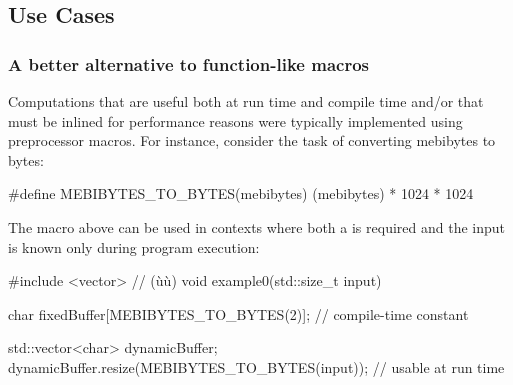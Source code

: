 \subsection[Use Cases]{Use Cases}\label{use-cases}

\subsubsection[A better alternative to function-like macros]{A better alternative to function-like macros}\label{a-better-alternative-to-function-like-macros}

Computations that are useful both at run time and compile time and/or
that must be inlined for performance reasons were typically implemented
using preprocessor macros. For instance, consider the task of converting
mebibytes to bytes:

\begin{emcppslisting}[emcppsbatch=e11]
#define MEBIBYTES_TO_BYTES(mebibytes) (mebibytes) * 1024 * 1024
\end{emcppslisting}


\noindent The macro above can be used in contexts where both a  is required and the input is known only during program
execution:

\begin{emcppslisting}[emcppsbatch=e11]
#include <vector>  // (ù{}ù)
void example0(std::size_t input)
{
    char fixedBuffer[MEBIBYTES_TO_BYTES(2)];  // compile-time constant

    std::vector<char> dynamicBuffer;
    dynamicBuffer.resize(MEBIBYTES_TO_BYTES(input));  // usable at run time
}
\end{emcppslisting}



